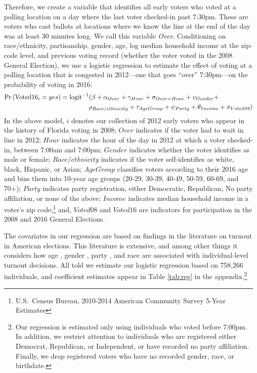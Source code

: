 \documentclass[12pt,titlepage]{article}
\begin{document}
Therefore, we create a variable that identifies all early voters who
voted at a polling location on a day where the last voter checked-in
past 7:30pm.  These are voters who cast ballots at locations where we
know the line at the end of the day was at least 30 minutes long.  We
call this variable \emph{Over}.  Conditioning on race/ethnicity,
partisanship, gender, age, log median household income at the zip-code level,
and previous voting record (whether the voter voted in the 2008
General Election), we use a logistic regression to estimate the effect
of voting at a polling location that is congested in 2012---one that
goes ``over'' 7:30pm---on the probability of voting in 2016:
\begin{equation*}
  \begin{aligned}
    \textup{Pr}\left(\mathrm{Voted16}_{i} = yes\right) =  \textup{logit}^{-1}&(\beta + \alpha_{Over} + \gamma_{Hour} +
    \sigma_{Over \times Hour} + \upsilon_{Gender}  + \\& \rho_{Race/ethnicity} +
      \tau_{Age Group} + \psi_{Party} + \theta_{Income} + \pi_{Voted\emph{08}})
  \end{aligned}  
\end{equation*}
%
In the above model, $i$ denotes our collection of 2012 early voters
who appear in the history of Florida voting in 2008; $Over$ indicates
if the voter had to wait in line in 2012; $Hour$ indicates the hour of
the day in 2012 at which a voter checked-in, between 7:00am and
7:00pm; $Gender$ indicates whether the voter identifies as male or
female; $Race/ethnicity$ indicates if the voter self-identifies as
white, black, Hispanic, or Asian; $Age Group$ classifies voters
according to their 2016 age and bins them into 10-year age groups
(20-29, 30-39, 40-49, 50-59, 60-69, and 70+); $Party$ indicates party
registration, either Democratic, Republican, No party affiliation, or
none of the above; $Income$ indicates median household income in a
voter's zip code;\footnote{U.S.\ Census Bureau, 2010-2014 American
  Community Survey 5-Year Estimates} and, $Voted08$ and $Voted16$ are
indicators for participation in the 2008 and 2016 General Elections.

The covariates in our regression are based on findings in the
literature on turnout in American elections.  This literature is
extensive, and among other things it considers how age
\cite{strateetal:age,hightonwolfinger:lifecycle}, gender
\cite{schlozman:genderdifferentvoice}, party
\cite{martinezgill:partisanturnout,grofmanetal:turnout}, and race
\cite{verbaetal:raceparticipation,fraga:raceturnout} are associated
with individual-level turnout decisions.  All told we estimate our
logistic regression based on 758,266 individuals, and coefficient
estimates appear in Table \ref{tab:reg} in the appendix.\footnote{Our
  regression is estimated only using individuals who voted before
  7:00pm.  In addition, we restrict attention to individuals who are
  registered either Democrat, Republican, or Independent, or have
  recorded no party affiliation.  Finally, we drop registered voters
  who have no recorded gender, race, or birthdate.}
\end{document}
